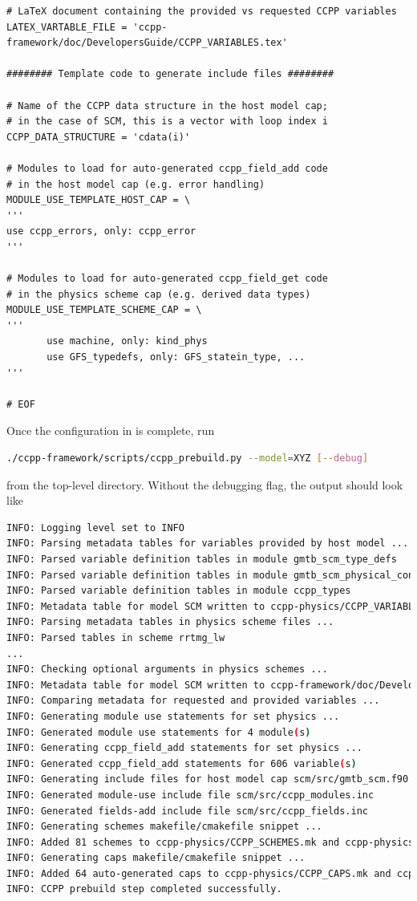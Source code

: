 \begin{lstlisting}
# LaTeX document containing the provided vs requested CCPP variables
LATEX_VARTABLE_FILE = 'ccpp-framework/doc/DevelopersGuide/CCPP_VARIABLES.tex'

######## Template code to generate include files ########

# Name of the CCPP data structure in the host model cap;
# in the case of SCM, this is a vector with loop index i
CCPP_DATA_STRUCTURE = 'cdata(i)'

# Modules to load for auto-generated ccpp_field_add code
# in the host model cap (e.g. error handling)
MODULE_USE_TEMPLATE_HOST_CAP = \
'''
use ccpp_errors, only: ccpp_error
'''

# Modules to load for auto-generated ccpp_field_get code
# in the physics scheme cap (e.g. derived data types)
MODULE_USE_TEMPLATE_SCHEME_CAP = \
'''
       use machine, only: kind_phys
       use GFS_typedefs, only: GFS_statein_type, ...
'''

# EOF
\end{lstlisting}
\clearpage

Once the configuration in  is complete, run
\begin{lstlisting}[language=bash]
./ccpp-framework/scripts/ccpp_prebuild.py --model=XYZ [--debug]
\end{lstlisting}
from the top-level directory. Without the debugging flag, the output should look like
\begin{lstlisting}[language=bash,basicstyle=\scriptsize\ttfamily]
INFO: Logging level set to INFO
INFO: Parsing metadata tables for variables provided by host model ...
INFO: Parsed variable definition tables in module gmtb_scm_type_defs
INFO: Parsed variable definition tables in module gmtb_scm_physical_constants
INFO: Parsed variable definition tables in module ccpp_types
INFO: Metadata table for model SCM written to ccpp-physics/CCPP_VARIABLES_SCM.html
INFO: Parsing metadata tables in physics scheme files ...
INFO: Parsed tables in scheme rrtmg_lw
...
INFO: Checking optional arguments in physics schemes ...
INFO: Metadata table for model SCM written to ccpp-framework/doc/DevelopersGuide/CCPP_VARIABLES_SCM.tex
INFO: Comparing metadata for requested and provided variables ...
INFO: Generating module use statements for set physics ...
INFO: Generated module use statements for 4 module(s)
INFO: Generating ccpp_field_add statements for set physics ...
INFO: Generated ccpp_field_add statements for 606 variable(s)
INFO: Generating include files for host model cap scm/src/gmtb_scm.f90 ...
INFO: Generated module-use include file scm/src/ccpp_modules.inc
INFO: Generated fields-add include file scm/src/ccpp_fields.inc
INFO: Generating schemes makefile/cmakefile snippet ...
INFO: Added 81 schemes to ccpp-physics/CCPP_SCHEMES.mk and ccpp-physics/CCPP_SCHEMES.cmake
INFO: Generating caps makefile/cmakefile snippet ...
INFO: Added 64 auto-generated caps to ccpp-physics/CCPP_CAPS.mk and ccpp-physics/CCPP_CAPS.cmake
INFO: CCPP prebuild step completed successfully.
\end{lstlisting}

